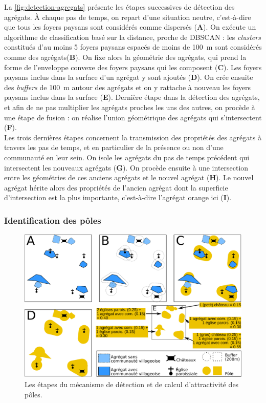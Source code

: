 La \cref{fig:detection-agregats} présente les étapes successives de détection des agrégats.
À chaque pas de temps, on repart d'une situation \og neutre\fg{}, c'est-à-dire que tous les foyers paysans sont considérés comme dispersés (\textbf{A}).
On exécute un algorithme de classification basé sur la distance, proche de DBSCAN : les \textit{clusters} constitués d'au moins 5 foyers paysans espacés de moins de 100~m sont considérés comme des agrégats(\textbf{B}).
On fixe alors la géométrie des agrégats, qui prend la forme de l'enveloppe convexe des foyers paysans qui les composent (\textbf{C}).
Les foyers paysans inclus dans la surface d'un agrégat y sont ajoutés (\textbf{D}).
On crée ensuite des \textit{buffers} de 100~m autour des agrégats et on y rattache à nouveau les foyers paysans inclus dans la surface (\textbf{E}).
Dernière étape dans la détection des agrégats, et afin de ne pas multiplier les agrégats proches les uns des autres, on procède à une étape de fusion : on réalise l'union géométrique des agrégats qui s'intersectent (\textbf{F}).\\
Les trois dernières étapes concernent la transmission des propriétés des agrégats à travers les pas de temps, et en particulier de la présence ou non d'une communauté en leur sein.
On isole les agrégats du pas de temps précédent qui intersectent les nouveaux agrégats (\textbf{G}).
On procède ensuite à une intersection entre les géométries de ces anciens agrégats et le nouvel agrégat (\textbf{H}).
Le nouvel agrégat hérite alors des propriétés de l'ancien agrégat dont la superficie d'intersection est la plus importante, c'est-à-dire l'agrégat orange ici (\textbf{I}).
	
	\subsubsection{Identification des pôles \label{sssec:poles}}

\begin{figure}[H]
	\centering
	\includegraphics[width=\linewidth]{img/detection_poles.pdf}
	\caption{Les étapes du mécanisme de détection et de calcul d'attractivité des pôles.}
	\label{fig:detection-poles}
\end{figure}

